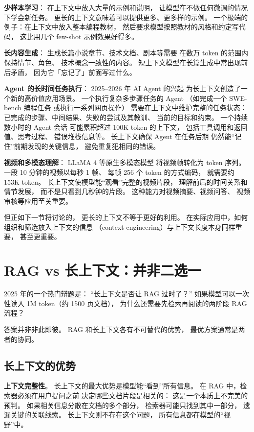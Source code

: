 \textbf{少样本学习}：
在上下文中放入大量的示例和说明，
让模型在不做任何微调的情况下学会新任务。
更长的上下文意味着可以提供更多、更多样的示例。
一个极端的例子：在上下文中放入整本编程教材，
然后要求模型按照教材的风格和约定写代码，
这比用几个 few-shot 示例效果好得多。

\textbf{长内容生成}：
生成长篇小说章节、技术文档、剧本等需要
在数万 token 的范围内保持情节、角色、
技术概念一致性的内容。
短上下文模型在长篇生成中常出现前后矛盾，
因为它「忘记了」前面写过什么。

\textbf{Agent 的长时间任务执行}：
2025--2026 年 AI Agent 的兴起
为长上下文创造了一个新的高价值应用场景。
一个执行复杂多步骤任务的 Agent
（如完成一个 SWE-bench 编程任务
或执行一系列网页操作）
需要在上下文中维护完整的任务状态：
已完成的步骤、中间结果、失败的尝试及其教训、
当前的目标和约束。
一个持续数小时的 Agent 会话
可能累积超过 100K token 的上下文，
包括工具调用和返回值、思考过程、
错误堆栈信息等。
长上下文确保 Agent 在任务后期
仍然能“记住”前期发现的关键信息，
避免重复犯相同的错误。

\textbf{视频和多模态理解}：
LLaMA 4 等原生多模态模型
将视频帧转化为 token 序列。
一段 10 分钟的视频以每秒 1 帧、
每帧 256 个 token 的方式编码，
就需要约 153K token。
长上下文使模型能“观看”完整的视频片段，
理解前后的时间关系和情节发展，
而不是只看到几秒钟的片段。
这种能力对视频摘要、视频问答、
视频审核等应用至关重要。

但正如下一节将讨论的，
更长的上下文不等于更好的利用。
在实际应用中，如何组织和筛选放入上下文的信息
（context engineering）与上下文长度本身同样重要，
甚至更重要。

\section{RAG vs 长上下文：并非二选一}
\label{sec:rag-vs-long-context}

2025 年的一个热门辩题是：
“长上下文是否让 RAG 过时了？”
如果模型可以一次性读入 1M token（约 1500 页文档），
为什么还需要先检索再阅读的两阶段 RAG 流程？

答案并非非此即彼。
RAG 和长上下文各有不可替代的优势，
最优方案通常是两者的协同。

\subsection{长上下文的优势}

\textbf{上下文完整性}。
长上下文的最大优势是模型能“看到”所有信息。
在 RAG 中，检索器必须在用户提问之前
决定哪些文档片段是相关的：
这是一个本质上不完美的预判。
如果相关信息分散在文档的多个部分，
检索器可能只找到其中一部分，
遗漏关键的关联线索。
长上下文则不存在这个问题，
所有信息都在模型的“视野”中。

